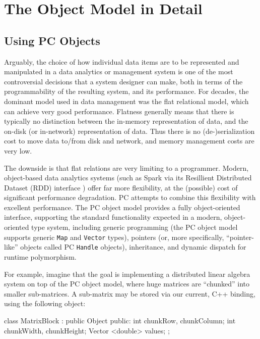 \section{The Object Model in Detail} \label{sec:ObjectModel}


\subsection{Using PC Objects}
\label{sec:pc-object1}
Arguably, the choice of how individual data items are to be represented and manipulated
in a data analytics or management system is one of the most
controversial decisions
that a system designer can make, both in terms of 
the programmability of the resulting system, and its performance.  For decades, the dominant model used in
data management was the flat relational model, which 
can achieve very good performance.
Flatness generally means 
that there is typically no distinction between the in-memory representation of data, and the on-disk (or in-network) representation of
data. Thus there is no (de-)serialization cost to move data to/from
disk and network, and memory management costs are very low. 

The downside is that flat relations are very limiting to a programmer.  Modern, object-based 
data analytics systems 
(such as Spark via its Resillient Distributed Dataset (RDD) interface \cite{zaharia2012resilient}) offer far more flexibility, at the (possible) cost of significant performance degradation.  
PC attempts to combine this flexibility with excellent performance.
The PC object model provides a fully object-oriented interface, supporting the standard functionality expected in a modern, object-oriented type system,
including generic programming (the PC object model supports generic \texttt{Map} and \texttt{Vector} types), 
pointers (or, more specifically,
``pointer-like'' objects called PC \texttt{Handle} objects), inheritance, and dynamic dispatch for runtime polymorphism.  

For example, imagine that the goal is implementing a distributed linear algebra system on top of the PC object model, where huge matrices are ``chunked'' into
smaller sub-matrices.  A sub-matrix may be stored via our current, C++ binding, using the following object:

\begin{codesmall}
class MatrixBlock : public Object {
public:
	int chunkRow, chunkColumn;
	int chunkWidth, chunkHeight;
	Vector <double> values; 
};
\end{codesmall}

